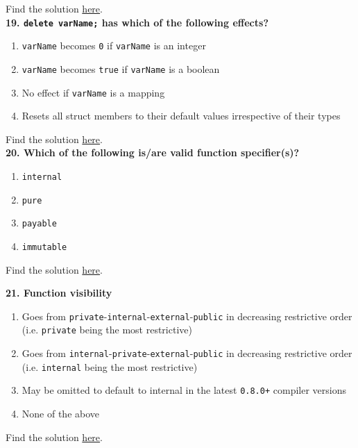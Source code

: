 Find the solution \hyperref[sec:exam2_q18]{here}.\\

\textbf{19. \texttt{delete varName;} has which of the following effects?}

\begin{enumerate}[label=\Alph*.]
    \item\verb|varName| becomes \verb|0| if \verb|varName| is an integer
    \item\verb|varName| becomes \verb|true| if \verb|varName| is a boolean
    \item No effect if \verb|varName| is a mapping
    \item Resets all struct members to their default values irrespective of their types
\end{enumerate}

Find the solution \hyperref[sec:exam2_q19]{here}.\\

\textbf{20. Which of the following is/are valid function specifier(s)?}

\begin{enumerate}[label=\Alph*.]
    \item\verb|internal|
    \item\verb|pure|
    \item\verb|payable|
    \item\verb|immutable|
\end{enumerate}

Find the solution \hyperref[sec:exam2_q20]{here}.\\

\pagebreak

\textbf{21. Function visibility}

\begin{enumerate}[label=\Alph*.]
    \item Goes from \verb|private|-\verb|internal|-\verb|external|-\verb|public| in decreasing restrictive order (i.e. \verb|private| being the most restrictive)
    \item Goes from \verb|internal|-\verb|private|-\verb|external|-\verb|public| in decreasing restrictive order (i.e. \verb|internal| being the most restrictive)
    \item May be omitted to default to internal in the latest \verb|0.8.0+| compiler versions
    \item None of the above
\end{enumerate}

Find the solution \hyperref[sec:exam2_q21]{here}.\\

